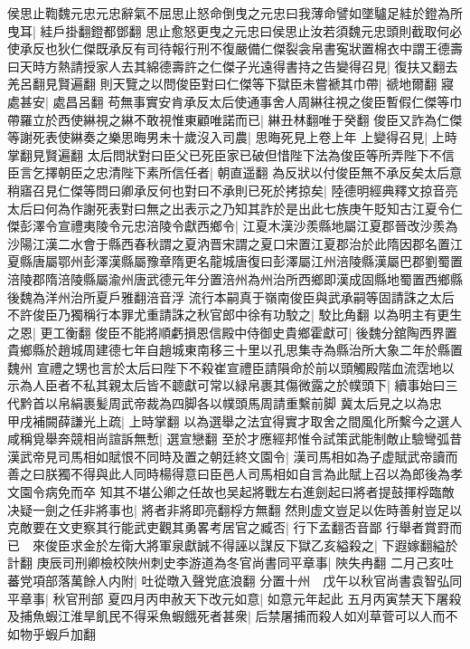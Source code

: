 侯思止鞫魏元忠元忠辭氣不屈思止怒命倒曳之元忠曰我薄命譬如墜驢足絓於鐙為所曳耳|{
	絓戶掛翻鐙都鄧翻}
思止愈怒更曳之元忠曰侯思止汝若須魏元忠頭則截取何必使承反也狄仁傑既承反有司待報行刑不復嚴備仁傑裂衾帛書寃狀置棉衣中謂王德壽曰天時方熱請授家人去其綿德壽許之仁傑子光遠得書持之告變得召見|{
	復扶又翻去羌呂翻見賢遍翻}
則天覽之以問俊臣對曰仁傑等下獄臣未嘗褫其巾帶|{
	禠地爾翻}
寢處甚安|{
	處昌呂翻}
苟無事實安肯承反太后使通事舍人周綝往視之俊臣暫假仁傑等巾帶羅立於西使綝視之綝不敢視惟東顧唯諾而已|{
	綝丑林翻唯于癸翻}
俊臣又詐為仁傑等謝死表使綝奏之樂思晦男未十歲沒入司農|{
	思晦死見上卷上年}
上變得召見|{
	上時掌翻見賢遍翻}
太后問狀對曰臣父已死臣家已破但惜陛下法為俊臣等所弄陛下不信臣言乞擇朝臣之忠清陛下素所信任者|{
	朝直遥翻}
為反狀以付俊臣無不承反矣太后意稍寤召見仁傑等問曰卿承反何也對曰不承則已死於拷掠矣|{
	陸德明經典釋文掠音亮}
太后曰何為作謝死表對曰無之出表示之乃知其詐於是出此七族庚午貶知古江夏令仁傑彭澤令宣禮夷陵令元忠涪陵令獻西鄉令|{
	江夏木漢沙羨縣地屬江夏郡晉改沙羨為沙陽江漢二水會于縣西春秋謂之夏汭晋宋謂之夏口宋置江夏郡治於此隋因郡名置江夏縣唐屬鄂州彭澤漢縣屬豫章隋更名龍城唐復曰彭澤屬江州涪陵縣漢屬巴郡劉蜀置涪陵郡隋涪陵縣屬渝州唐武德元年分置涪州為州治所西鄉即漢成固縣地蜀置西鄉縣後魏為洋州治所夏戶雅翻涪音浮}
流行本嗣真于嶺南俊臣與武承嗣等固請誅之太后不許俊臣乃獨稱行本罪尤重請誅之秋官郎中徐有功駮之|{
	駮比角翻}
以為明主有更生之恩|{
	更工衡翻}
俊臣不能將順虧損恩信殿中侍御史貴鄉霍獻可|{
	後魏分舘陶西界置貴鄉縣於趙城周建德七年自趙城東南移三十里以孔思集寺為縣治所大象二年於縣置魏州}
宣禮之甥也言於太后曰陛下不殺崔宣禮臣請隕命於前以頭觸殿階血流霑地以示為人臣者不私其親太后皆不聼獻可常以緑帛裹其傷微露之於幞頭下|{
	續事始曰三代黔首以帛絹裹髪周武帝裁為四脚各以幞頭馬周請重繫前脚}
冀太后見之以為忠　甲戌補闕薛謙光上疏|{
	上時掌翻}
以為選舉之法宜得實才取舍之間風化所繫今之選人咸稱覓舉奔競相尚諠訴無慙|{
	選宣戀翻}
至於才應經邦惟令試策武能制敵止驗彎弧昔漢武帝見司馬相如賦恨不同時及置之朝廷終文園令|{
	漢司馬相如為子虚賦武帝讀而善之曰朕獨不得與此人同時楊得意曰臣邑人司馬相如自言為此賦上召以為郎後為孝文園令病免而卒}
知其不堪公卿之任故也吴起將戰左右進劍起曰將者提鼓揮桴臨敵决疑一劍之任非將事也|{
	將者非將即亮翻桴方無翻}
然則虚文豈足以佐時善射豈足以克敵要在文吏察其行能武吏觀其勇畧考居官之臧否|{
	行下孟翻否音鄙}
行舉者賞罸而已　來俊臣求金於左衛大將軍泉獻誠不得誣以謀反下獄乙亥縊殺之|{
	下遐嫁翻縊於計翻}
庚辰司刑卿檢校陜州刺史李游道為冬官尚書同平章事|{
	陜失冉翻}
二月己亥吐蕃党項部落萬餘人内附|{
	吐從暾入聲党底浪翻}
分置十州　戊午以秋官尚書袁智弘同平章事|{
	秋官刑部}
夏四月丙申赦天下改元如意|{
	如意元年起此}
五月丙寅禁天下屠殺及捕魚蝦江淮旱飢民不得采魚蝦餓死者甚衆|{
	后禁屠捕而殺人如刈草菅可以人而不如物乎蝦戶加翻}
